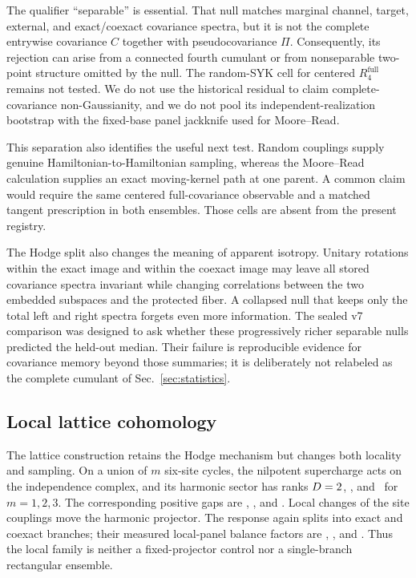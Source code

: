 The qualifier ``separable'' is essential.  That null matches marginal
channel, target, external, and exact/coexact covariance spectra, but it is not
the complete entrywise covariance $C$ together with pseudocovariance $\Pi$.
Consequently, its rejection can arise from a connected fourth cumulant or
from nonseparable two-point structure omitted by the null.  The random-SYK
cell for centered $R_4^{\mathrm{full}}$ remains not tested.  We do not use the
historical residual to claim complete-covariance non-Gaussianity, and we do
not pool its independent-realization bootstrap with the fixed-base panel
jackknife used for Moore--Read.

This separation also identifies the useful next test.  Random couplings
supply genuine Hamiltonian-to-Hamiltonian sampling, whereas the Moore--Read
calculation supplies an exact moving-kernel path at one parent.  A common
claim would require the same centered full-covariance observable and a
matched tangent prescription in both ensembles.  Those cells are absent from
the present registry.

The Hodge split also changes the meaning of apparent isotropy.  Unitary
rotations within the exact image and within the coexact image may leave all
stored covariance spectra invariant while changing correlations between the
two embedded subspaces and the protected fiber.  A collapsed null that keeps
only the total left and right spectra forgets even more information.  The
sealed v7 comparison was designed to ask whether these progressively richer
separable nulls predicted the held-out median.  Their failure is reproducible
evidence for covariance memory beyond those summaries; it is deliberately
not relabeled as the complete cumulant of Sec.~\ref{sec:statistics}.

\subsection{Local lattice cohomology}

The lattice construction retains the Hodge mechanism but changes both
locality and sampling.  On a union of $m$ six-site cycles, the nilpotent
supercharge acts on the independence complex, and its harmonic sector has
ranks $D=2$, \LatticeSusyMTwoRank, and
\LatticeSusyMThreeRank\ for $m=1,2,3$.  The corresponding positive gaps are
\LatticeSusyMOneExternalGap, \LatticeSusyMTwoExternalGap, and
\LatticeSusyMThreeExternalGap.  Local changes of the site couplings move the
harmonic projector.  The response again splits into exact and coexact
branches; their measured local-panel balance factors are
\LatticeSusyMOneHodgeBalance, \LatticeSusyMTwoHodgeBalance, and
\LatticeSusyMThreeHodgeBalance.  Thus the local family is neither a
fixed-projector control nor a single-branch rectangular ensemble.

